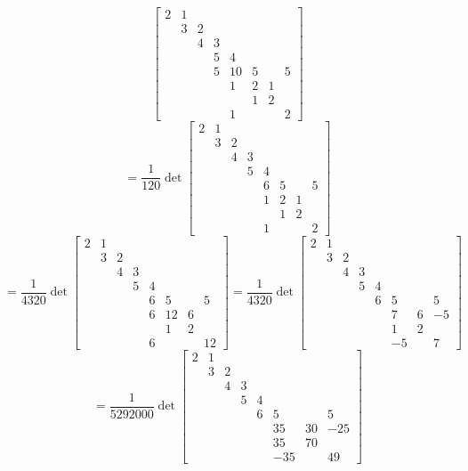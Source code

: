 \documentclass[12pt]{article}
\begin{document}
\begin{itemize}
$$\begin{bmatrix}
2 & 1 \\
& 3 & 2 \\
& & 4 & 3 \\
& & & 5 & 4 \\
& & & 5 & 10 & 5 & & 5\\
& & & & 1 & 2 & 1 \\
& & & & & 1 & 2 \\
& & & & 1 & & & 2
\end{bmatrix}$$
$$= \frac{1}{120}\det\begin{bmatrix}
2 & 1 \\
& 3 & 2 \\
& & 4 & 3 \\
& & & 5 & 4 \\
& & & & 6 & 5 & & 5\\
& & & & 1 & 2 & 1 \\
& & & & & 1 & 2 \\
& & & & 1 & & & 2
\end{bmatrix}$$
$$= \frac{1}{4320}\det\begin{bmatrix}
2 & 1 \\
& 3 & 2 \\
& & 4 & 3 \\
& & & 5 & 4 \\
& & & & 6 & 5 & & 5\\
& & & & 6 & 12 & 6 \\
& & & & & 1 & 2 \\
& & & & 6 & & & 12
\end{bmatrix} = \frac{1}{4320}\det\begin{bmatrix}
2 & 1 \\
& 3 & 2 \\
& & 4 & 3 \\
& & & 5 & 4 \\
& & & & 6 & 5 & & 5\\
& & & & & 7 & 6 & -5\\
& & & & & 1 & 2 \\
& & & & & -5 & & 7
\end{bmatrix}$$
$$= \frac{1}{5292000}\det\begin{bmatrix}
2 & 1 \\
& 3 & 2 \\
& & 4 & 3 \\
& & & 5 & 4 \\
& & & & 6 & 5 & & 5\\
& & & & & 35 & 30 & -25\\
& & & & & 35 & 70 \\
& & & & & -35 & & 49
\end{bmatrix}$$

\end{itemize}
\end{document}
